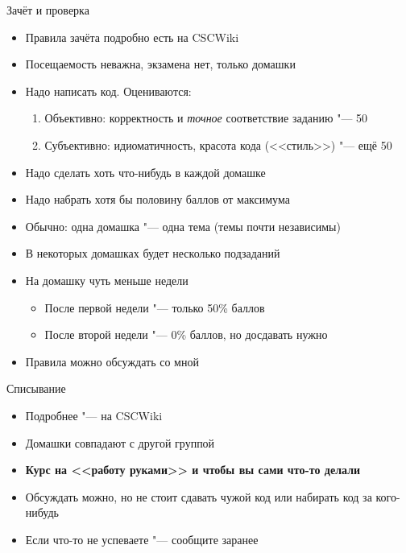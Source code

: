 \begin{frame}[t]{Зачёт и проверка}
	\begin{itemize}
		\item Правила зачёта подробно есть на CSCWiki
		\item Посещаемость неважна, экзамена нет, только домашки
		\item Надо написать код. Оцениваются:
			\begin{enumerate}
			\item Объективно: корректность и \textit{точное} соответствие заданию "--- 50
			\item Субъективно: идиоматичность, красота кода (<<стиль>>) "--- ещё 50
			\end{enumerate}
		\item Надо сделать хоть что-нибудь в каждой домашке
		\item Надо набрать хотя бы половину баллов от максимума
		\item Обычно: одна домашка "--- одна тема (темы почти независимы)
		\item В некоторых домашках будет несколько подзаданий
		\item На домашку чуть меньше недели
			\begin{itemize}
				\item После первой недели "--- только 50\% баллов
				\item После второй недели "--- 0\% баллов, но досдавать нужно
			\end{itemize}
		\item Правила можно обсуждать со мной
	\end{itemize}
\end{frame}

\begin{frame}[t]{Списывание}
	\begin{itemize}
		\item Подробнее "--- на CSCWiki
		\item Домашки совпадают с другой группой
		\item \textbf{Курс на <<работу руками>> и чтобы вы сами что-то делали}
		\item Обсуждать можно, но не стоит сдавать чужой код или набирать код за кого-нибудь
		\item Если что-то не успеваете "--- сообщите заранее
	\end{itemize}
\end{frame}

